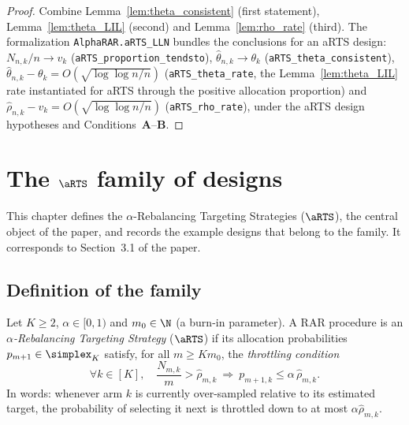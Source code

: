 \begin{proof}\leanok
{}
Combine Lemma~\ref{lem:theta_consistent} (first statement), Lemma~\ref{lem:theta_LIL}
(second) and Lemma~\ref{lem:rho_rate} (third). The formalization \texttt{AlphaRAR.aRTS\_LLN} bundles
the conclusions for an aRTS design: $N_{n,k}/n\to v_k$ (\texttt{aRTS\_proportion\_tendsto}),
$\hat\theta_{n,k}\to\theta_k$ (\texttt{aRTS\_theta\_consistent}),
$\hat\theta_{n,k}-\theta_k=O(\sqrt{\log\log n/n})$ (\texttt{aRTS\_theta\_rate}, the
Lemma~\ref{lem:theta_LIL} rate instantiated for aRTS through the positive allocation proportion)
and $\hat\rho_{n,k}-v_k=O(\sqrt{\log\log n/n})$ (\texttt{aRTS\_rho\_rate}), under the aRTS design
hypotheses and Conditions~\textbf{A}--\textbf{B}.
\end{proof}


\chapter{The \texorpdfstring{$\aRTS$}{aRTS} family of designs}
\label{chap:design}

This chapter defines the $\alpha$-Rebalancing Targeting Strategies ($\aRTS$),
the central object of the paper, and records the example designs that belong to
the family. It corresponds to Section~3.1 of the paper.

\section{Definition of the family}
\label{sec:design_def}

\begin{definition}\label{def:aRTS}
Let $K \ge 2$, $\alpha \in [0,1)$ and $m_0 \in \N$ (a burn-in parameter).
A RAR procedure is an \emph{$\alpha$-Rebalancing Targeting Strategy} ($\aRTS$)
if its allocation probabilities $p_{m+1} \in \simplex_K$ satisfy, for all
$m \ge K m_0$, the \emph{throttling condition}
\begin{equation}\label{eq:throttle}
  \forall k \in [K], \quad
  \frac{N_{m,k}}{m} > \hat{\rho}_{m,k}
  \ \Longrightarrow\
  p_{m+1,k} \le \alpha\, \hat{\rho}_{m,k}.
\end{equation}
In words: whenever arm $k$ is currently over-sampled relative to its estimated
target, the probability of selecting it next is throttled down to at most
$\alpha \hat{\rho}_{m,k}$.
\end{definition}

